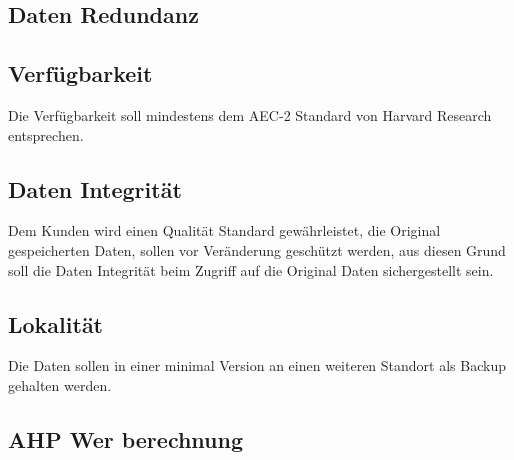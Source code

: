 \subsection{Daten Redundanz}




\subsection{Verfügbarkeit}
Die Verfügbarkeit soll mindestens dem AEC-2 Standard von Harvard Research entsprechen.

\subsection{Daten Integrität}
Dem Kunden wird einen Qualität Standard gewährleistet, die Original gespeicherten Daten, sollen vor Veränderung geschützt werden, aus diesen Grund soll die Daten Integrität beim Zugriff auf die Original Daten sichergestellt sein.

\subsection{Lokalität}
Die Daten sollen in einer minimal Version an einen weiteren Standort als Backup gehalten werden.



\subsection{AHP Wer berechnung}

